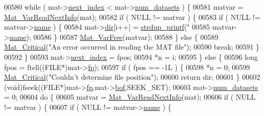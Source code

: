 \begin{DoxyCode}
{{{{{{{{{{{{{{{{{{{00580             \textcolor{keywordflow}{while} ( mat->\hyperlink{struct__mat__t_a0163a12f9735356723bb604992639d9e}{next\_index} < mat->\hyperlink{struct__mat__t_af37d0ba323e65edb27ecd5a2f766a3a4}{num\_datasets} ) \{
00581                 matvar = \hyperlink{group___m_a_t_ga72dd99330507b17177e22f9ed3bea5e6}{Mat\_VarReadNextInfo}(mat);
00582                 \textcolor{keywordflow}{if} ( NULL != matvar ) \{
00583                     \textcolor{keywordflow}{if} ( NULL != matvar->\hyperlink{group___m_a_t_a5d4b55b041e3b4fb50c04337f05ad909}{name} ) \{
00584                         mat->\hyperlink{struct__mat__t_a1bc6c604459d0787801d5e53d365684c}{dir}[i++] = \hyperlink{group__mat__util_ga291b08f933c75fb70e3736b669896ebd}{strdup\_printf}(\textcolor{stringliteral}{"%
00585                             matvar->\hyperlink{group___m_a_t_a5d4b55b041e3b4fb50c04337f05ad909}{name});
00586                     \}
00587                     \hyperlink{group___m_a_t_ga1d14716f7450530fd1c9d02413787f0e}{Mat\_VarFree}(matvar);
00588                 \} \textcolor{keywordflow}{else} \{
00589                     \hyperlink{group__mat__util_gaf51f2bfbb5580f575e4dd79757e2b80c}{Mat\_Critical}(\textcolor{stringliteral}{"An error occurred in reading the MAT file"});
00590                     \textcolor{keywordflow}{break};
00591                 \}
00592             \}
00593             mat->\hyperlink{struct__mat__t_a0163a12f9735356723bb604992639d9e}{next\_index} = fpos;
00594             *n = i;
00595         \} \textcolor{keywordflow}{else} \{
00596             \textcolor{keywordtype}{long} fpos = ftell((FILE*)mat->\hyperlink{struct__mat__t_a85f562e407ca9ad4d2a6e14f839432b7}{fp});
00597             \textcolor{keywordflow}{if} ( fpos == -1L ) \{
00598                 *n = 0;
00599                 \hyperlink{group__mat__util_gaf51f2bfbb5580f575e4dd79757e2b80c}{Mat\_Critical}(\textcolor{stringliteral}{"Couldn't determine file position"});
00600                 \textcolor{keywordflow}{return} dir;
00601             \}
00602             (void)fseek((FILE*)mat->\hyperlink{struct__mat__t_a85f562e407ca9ad4d2a6e14f839432b7}{fp},mat->\hyperlink{struct__mat__t_a0f87794a6113bd568fe591953e20ddf3}{bof},SEEK\_SET);
00603             mat->\hyperlink{struct__mat__t_af37d0ba323e65edb27ecd5a2f766a3a4}{num\_datasets} = 0;
00604             \textcolor{keywordflow}{do} \{
00605                 matvar = \hyperlink{group___m_a_t_ga72dd99330507b17177e22f9ed3bea5e6}{Mat\_VarReadNextInfo}(mat);
00606                 \textcolor{keywordflow}{if} ( NULL != matvar ) \{
00607                     \textcolor{keywordflow}{if} ( NULL != matvar->\hyperlink{group___m_a_t_a5d4b55b041e3b4fb50c04337f05ad909}{name} ) \{
}}}}}}}}}}}}}}}}}}}}
\end{DoxyCode}
